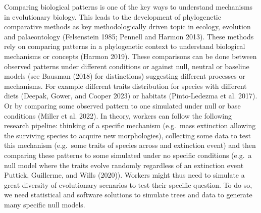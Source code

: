 \documentclass[
]{article}
\begin{document}
Comparing biological patterns is one of the key ways to understand
mechanisms in evolutionary biology. This leads to the development of
phylogenetic comparative methods as key methodologically driven topic in
ecology, evolution and palaeontology (Felsenstein 1985; Pennell and
Harmon 2013). These methods rely on comparing patterns in a phylogenetic
context to understand biological mechanisms or concepts (Harmon 2019).
These comparisons can be done between observed patterns under different
conditions or against null, neutral or baseline models (see Bausman
(2018) for distinctions) suggesting different processes or mechanisms.
For example different traits distribution for species with different
diets (Deepak, Gower, and Cooper 2023) or habitats (Pinto-Ledezma et al.
2017). Or by comparing some observed pattern to one simulated under null
or base conditions (Miller et al. 2022). In theory, workers can follow
the following research pipeline: thinking of a specific mechanism
(e.g.~mass extinction allowing the surviving species to acquire new
morphologies), collecting some data to test this mechanism (e.g.~some
traits of species across and extinction event) and then comparing these
patterns to some simulated under no specific conditions (e.g.~a null
model where the traits evolve randomly regardless of an extinction event
Puttick, Guillerme, and Wills (2020)). Workers might thus need to
simulate a great diversity of evolutionary scenarios to test their
specific question. To do so, we need statistical and software solutions
to simulate trees and data to generate many specific null models.
\end{document}
